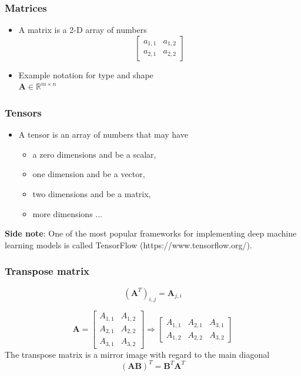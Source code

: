 \documentclass[notes]{beamer}          %
\newcommand{\vect}[1]{\bm{#1}}
\newcommand{\field}[1]{\mathbb{#1}}
\newcommand{\R}{\field{R}}
\begin{document}
\begin{frame}
\frametitle{Matrices}
\begin{itemize}
    \item A matrix is a 2-D array of numbers \\
    $$
    \begin{bmatrix}
    a_{1,1} & a_{1,2} \\
    a_{2,1} & a_{2,2}
    \end{bmatrix}
    $$
    \item Example notation for type and shape \\
    $\mathbf{A} \in \R^{m \times n}$
\end{itemize}
\end{frame}

\begin{frame}
\frametitle{Tensors}
\begin{itemize}
    \item A tensor is an array of numbers that may have
    \begin{itemize}
        \item a zero dimensions and be a scalar,
        \item one dimension and be a vector,
        \item two dimensions and be a matrix,
        \item more dimensions ...
    \end{itemize}
\end{itemize}

{\bf Side note}: One of the most popular frameworks for implementing deep machine learning models is called TensorFlow (https://www.tensorflow.org/).

\end{frame}

\begin{frame}
\frametitle{Transpose matrix}
         $$(\vect{A}^T)_{i,j} = \vect{A}_{j,i}$$

        $$ \vect{A} = \begin{bmatrix}
                        A_{1,1} & A_{1,2}  \\
                        A_{2,1} & A_{2,2}  \\
                        A_{3,1} & A_{3,2}
                      \end{bmatrix} \Rightarrow
                      \begin{bmatrix}
                        A_{1,1} & A_{2,1} & A_{3,1} \\
                        A_{1,2} & A_{2,2} & A_{3,2}
                      \end{bmatrix}
                      $$
        The transpose matrix is a mirror image with regard to the main diagonal \\
        $$(\vect{A}\vect{B})^T = \vect{B}^T\vect{A}^T$$

\end{frame}
\end{document}

